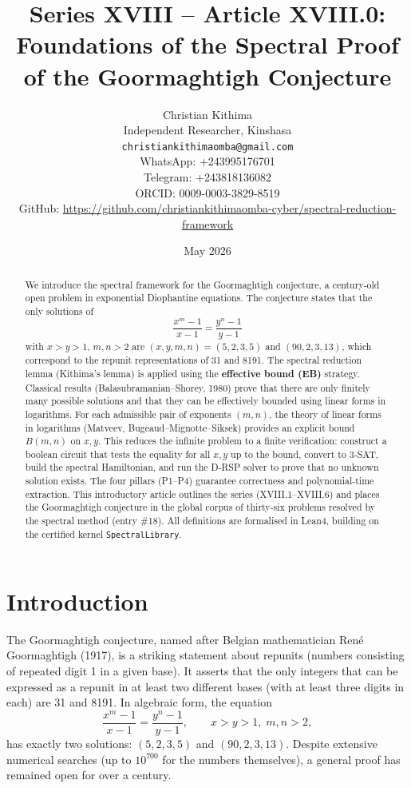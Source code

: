 \documentclass[11pt,a4paper]{article}
\title{Series XVIII – Article XVIII.0: Foundations of the Spectral Proof of the Goormaghtigh Conjecture}
\author{Christian Kithima \\
Independent Researcher, Kinshasa \\
\texttt{christiankithimaomba@gmail.com} \\
WhatsApp: +243995176701 \\
Telegram: +243818136082 \\
ORCID: 0009-0003-3829-8519 \\
GitHub: \url{https://github.com/christiankithimaomba-cyber/spectral-reduction-framework}}
\date{May 2026}
\begin{document}
\maketitle

\begin{abstract}
We introduce the spectral framework for the Goormaghtigh conjecture, a century‑old open problem in exponential Diophantine equations. The conjecture states that the only solutions of
\[
\frac{x^{m}-1}{x-1} = \frac{y^{n}-1}{y-1}
\]
with \(x>y>1\), \(m,n>2\) are \((x,y,m,n)=(5,2,3,5)\) and \((90,2,3,13)\), which correspond to the repunit representations of 31 and 8191. The spectral reduction lemma (Kithima's lemma) is applied using the \textbf{effective bound (EB)} strategy. Classical results (Balasubramanian–Shorey, 1980) prove that there are only finitely many possible solutions and that they can be effectively bounded using linear forms in logarithms. For each admissible pair of exponents \((m,n)\), the theory of linear forms in logarithms (Matveev, Bugeaud–Mignotte–Siksek) provides an explicit bound \(B(m,n)\) on \(x,y\). This reduces the infinite problem to a finite verification: construct a boolean circuit that tests the equality for all \(x,y\) up to the bound, convert to 3‑SAT, build the spectral Hamiltonian, and run the D‑RSP solver to prove that no unknown solution exists. The four pillars (P1–P4) guarantee correctness and polynomial‑time extraction. This introductory article outlines the series (XVIII.1–XVIII.6) and places the Goormaghtigh conjecture in the global corpus of thirty‑six problems resolved by the spectral method (entry \#18). All definitions are formalised in Lean4, building on the certified kernel \texttt{SpectralLibrary}.
\end{abstract}

\tableofcontents

\section{Introduction}

The Goormaghtigh conjecture, named after Belgian mathematician René Goormaghtigh (1917), is a striking statement about repunits (numbers consisting of repeated digit 1 in a given base). It asserts that the only integers that can be expressed as a repunit in at least two different bases (with at least three digits in each) are 31 and 8191. In algebraic form, the equation
\[
\frac{x^{m}-1}{x-1} = \frac{y^{n}-1}{y-1},\qquad x>y>1,\; m,n>2,
\]
has exactly two solutions: \((5,2,3,5)\) and \((90,2,3,13)\). Despite extensive numerical searches (up to \(10^{700}\) for the numbers themselves), a general proof has remained open for over a century.
\end{document}
